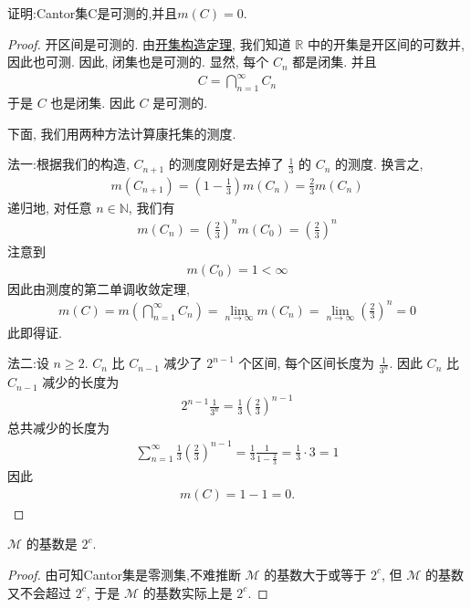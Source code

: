 \documentclass[../../main.tex]{subfiles}%
\begin{document}
\begin{proposition}\label{proposition:Cantor集可测且测度为0}
证明:Cantor集C是可测的,并且$m(C)=0$.
\end{proposition}
\begin{proof}
开区间是可测的. 由\hyperref[theorem:开集构造定理]{开集构造定理}, 我们知道 \(\mathbb{R}\) 中的开集是开区间的可数并, 因此也可测. 因此, 闭集也是可测的. 显然, 每个 \(C_n\) 都是闭集. 并且
\begin{align*}
C = \bigcap_{n = 1}^{\infty} C_n
\end{align*}
于是 \(C\) 也是闭集. 因此 \(C\) 是可测的.

下面, 我们用两种方法计算康托集的测度.

{\color{blue}法一:}根据我们的构造, \(C_{n + 1}\) 的测度刚好是去掉了 \(\frac{1}{3}\) 的 \(C_n\) 的测度. 换言之,
\begin{align*}
m(C_{n + 1}) = \left(1 - \frac{1}{3}\right)m(C_n) = \frac{2}{3}m(C_n)
\end{align*}
递归地, 对任意 \(n \in \mathbb{N}\), 我们有
\begin{align*}
m(C_n) = \left(\frac{2}{3}\right)^n m(C_0) = \left(\frac{2}{3}\right)^n
\end{align*}
注意到
\begin{align*}
m(C_0) = 1 < \infty
\end{align*}
因此由测度的第二单调收敛定理,
\begin{align*}
m(C) = m\left(\bigcap_{n = 1}^{\infty} C_n\right) = \lim_{n \to \infty} m(C_n) = \lim_{n \to \infty} \left(\frac{2}{3}\right)^n = 0
\end{align*}
此即得证.

{\color{blue}法二:}设 \(n \geqslant  2\). \(C_n\) 比 \(C_{n - 1}\) 减少了 \(2^{n - 1}\) 个区间, 每个区间长度为 \(\frac{1}{3^n}\). 因此 \(C_n\) 比 \(C_{n - 1}\) 减少的长度为
\begin{align*}
2^{n - 1}\frac{1}{3^n} = \frac{1}{3}\left(\frac{2}{3}\right)^{n - 1}
\end{align*}
总共减少的长度为
\begin{align*}
\sum_{n = 1}^{\infty} \frac{1}{3}\left(\frac{2}{3}\right)^{n - 1} = \frac{1}{3} \frac{1}{1 - \frac{2}{3}} = \frac{1}{3} \cdot 3 = 1
\end{align*}
因此
\begin{align*}
m(C) = 1 - 1 = 0.
\end{align*} 
\end{proof}

\begin{proposition}\label{proposition:可测集类的基数是2^c}
\(\mathscr{M}\) 的基数是 \(2^c\).
\end{proposition}
\begin{proof}
由可知Cantor集是零测集,不难推断 \(\mathscr{M}\) 的基数大于或等于 \(2^c\), 但 \(\mathscr{M}\) 的基数又不会超过 \(2^c\), 于是 \(\mathscr{M}\) 的基数实际上是 \(2^c\). 
\end{proof}
\end{document}
